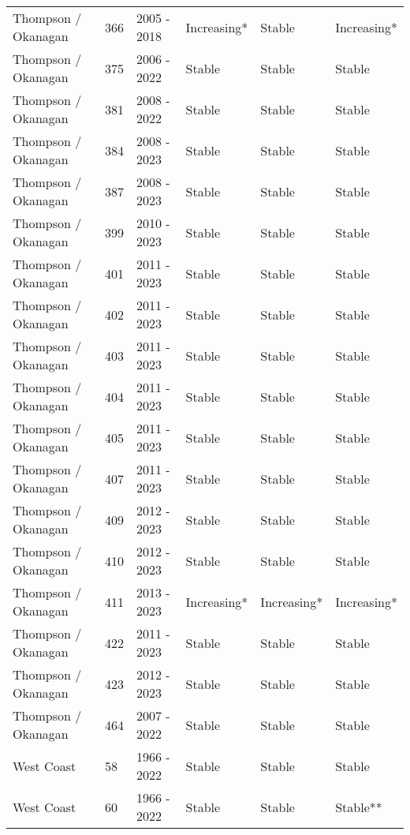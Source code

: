 \documentclass[
]{article}
\begin{document}
\begin{longtable}{lllp{0.9in}p{0.9in}p{0.9in}}
   \rowcolor{increasing}Thompson / Okanagan & 366 & 2005 - 2018 & Increasing* & Stable & Increasing* \\ 
   \rowcolor{stable}Thompson / Okanagan & 375 & 2006 - 2022 & Stable & Stable & Stable \\ 
   \rowcolor{stable}Thompson / Okanagan & 381 & 2008 - 2022 & Stable & Stable & Stable \\ 
   \rowcolor{stable}Thompson / Okanagan & 384 & 2008 - 2023 & Stable & Stable & Stable \\ 
   \rowcolor{stable}Thompson / Okanagan & 387 & 2008 - 2023 & Stable & Stable & Stable \\ 
   \rowcolor{stable}Thompson / Okanagan & 399 & 2010 - 2023 & Stable & Stable & Stable \\ 
   \rowcolor{stable}Thompson / Okanagan & 401 & 2011 - 2023 & Stable & Stable & Stable \\ 
   \rowcolor{stable}Thompson / Okanagan & 402 & 2011 - 2023 & Stable & Stable & Stable \\ 
   \rowcolor{stable}Thompson / Okanagan & 403 & 2011 - 2023 & Stable & Stable & Stable \\ 
   \rowcolor{stable}Thompson / Okanagan & 404 & 2011 - 2023 & Stable & Stable & Stable \\ 
   \rowcolor{stable}Thompson / Okanagan & 405 & 2011 - 2023 & Stable & Stable & Stable \\ 
   \rowcolor{stable}Thompson / Okanagan & 407 & 2011 - 2023 & Stable & Stable & Stable \\ 
   \rowcolor{stable}Thompson / Okanagan & 409 & 2012 - 2023 & Stable & Stable & Stable \\ 
   \rowcolor{stable}Thompson / Okanagan & 410 & 2012 - 2023 & Stable & Stable & Stable \\ 
   \rowcolor{increasing}Thompson / Okanagan & 411 & 2013 - 2023 & Increasing* & Increasing* & Increasing* \\ 
   \rowcolor{stable}Thompson / Okanagan & 422 & 2011 - 2023 & Stable & Stable & Stable \\ 
   \rowcolor{stable}Thompson / Okanagan & 423 & 2012 - 2023 & Stable & Stable & Stable \\ 
   \rowcolor{stable}Thompson / Okanagan & 464 & 2007 - 2022 & Stable & Stable & Stable \\ 
   \rowcolor{stable}West Coast & 58 & 1966 - 2022 & Stable & Stable & Stable \\ 
   \rowcolor{stable}West Coast & 60 & 1966 - 2022 & Stable & Stable & Stable** \\ 

\end{longtable}
\end{document}
